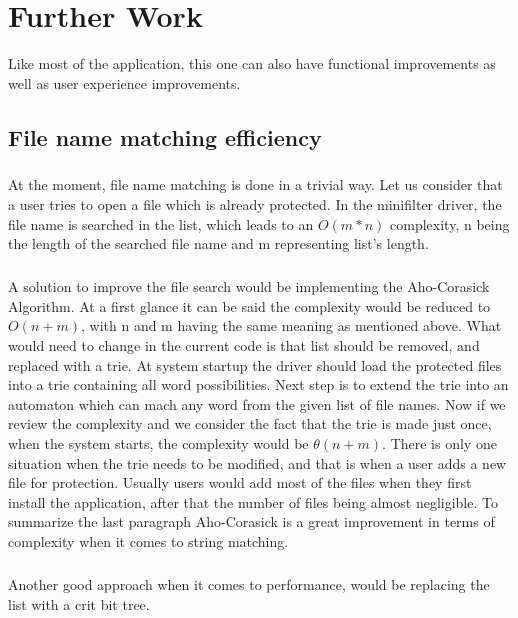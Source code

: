 \chapter{Further Work}

Like most of the application, this one can also have functional improvements as well as user experience improvements. 

\section{File name matching efficiency}

\paragraph{}
At the moment, file name matching is done in a trivial way. Let us consider that a user tries to open a file which is already protected. In the minifilter driver, the file name is searched in the list, which leads to an $O(m*n)$ complexity, n being the length of the searched file name and m representing list's length.
\paragraph{}
A solution to improve the file search would be implementing the Aho-Corasick Algorithm. At a first glance it can be said the complexity would be reduced to $O(n + m)$, with n and m having the same meaning as mentioned above. What would need to change in the current code is that list should be removed, and replaced with a trie. At system startup the driver should load the protected files into a trie containing all word possibilities. Next step is to extend the trie into an automaton which can mach any word from the given list of file names. Now if we review the complexity and we consider the fact that the trie is made just once, when the system starts, the complexity would be $\theta(n + m)$. There is only one situation when the trie needs to be modified, and that is when a user adds a new file for protection. Usually users would add most of the files when they first install the application, after that the number of files being almost negligible. To summarize the last paragraph Aho-Corasick is a great improvement in terms of complexity when it comes to string matching.

\paragraph{}
Another good approach when it comes to performance, would be replacing the list with a crit bit tree.


